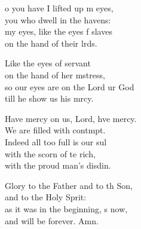 \settowidth{\versewidth}{so our eyes are on the Lord our God *}
\begin{psalmverse}%
  \begin{patverse}
o you have I lifted up m eyes,\Med\\
you who dwell in the havens:\\
my eyes, like the eyes f slaves\Med\\
on the hand of their lrds.

Like the eyes of  servant\Med\\
on the hand of her m\pointup{\i}stress,\\
so our eyes are on the Lord ur God\Med\\
till he show us his mrcy.

Have mercy on us, Lord, hve mercy.\Med\\
We are filled with contmpt.\\
Indeed all too full is our sul\Flex\\
with the scorn of te rich,\Med\\
with the proud man’s disdin.

Glory to the Father and to th Son,\Med\\
and to the Holy Sp\pointup{\i}rit:\\
as it was in the beginning, \pointup{\i}s now,\Med\\
and will be forever. Amn. 
  \end{patverse}
\end{psalmverse}
